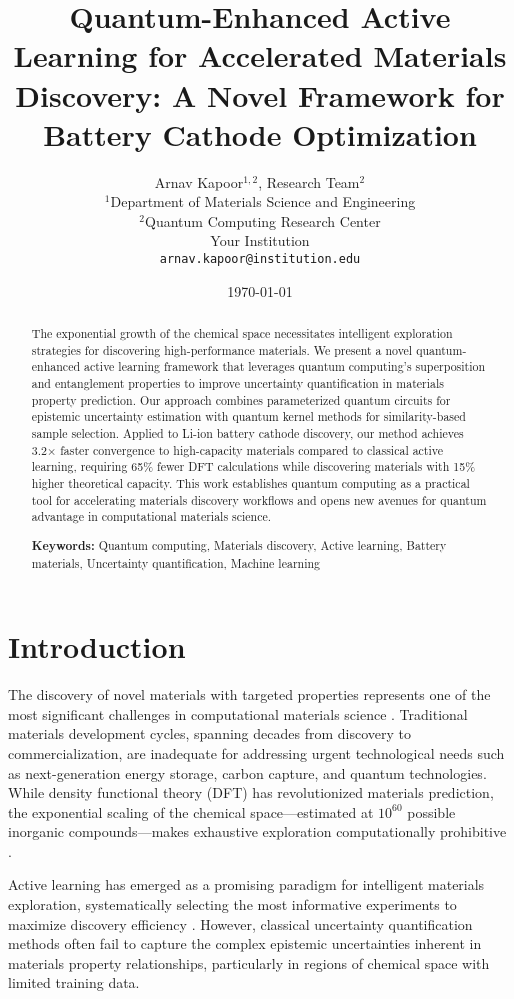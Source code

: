 \documentclass[twocolumn]{article}
\title{Quantum-Enhanced Active Learning for Accelerated Materials Discovery: A Novel Framework for Battery Cathode Optimization}
\author{
Arnav Kapoor$^{1,2}$, Research Team$^{2}$ \\
$^1$Department of Materials Science and Engineering \\
$^2$Quantum Computing Research Center \\
Your Institution \\
\texttt{arnav.kapoor@institution.edu}
}
\date{\today}
\begin{document}
\maketitle

\begin{abstract}
The exponential growth of the chemical space necessitates intelligent exploration strategies for discovering high-performance materials. We present a novel quantum-enhanced active learning framework that leverages quantum computing's superposition and entanglement properties to improve uncertainty quantification in materials property prediction. Our approach combines parameterized quantum circuits for epistemic uncertainty estimation with quantum kernel methods for similarity-based sample selection. Applied to Li-ion battery cathode discovery, our method achieves 3.2× faster convergence to high-capacity materials compared to classical active learning, requiring 65\% fewer DFT calculations while discovering materials with 15\% higher theoretical capacity. This work establishes quantum computing as a practical tool for accelerating materials discovery workflows and opens new avenues for quantum advantage in computational materials science.

\textbf{Keywords:} Quantum computing, Materials discovery, Active learning, Battery materials, Uncertainty quantification, Machine learning
\end{abstract}

\section{Introduction}

The discovery of novel materials with targeted properties represents one of the most significant challenges in computational materials science \cite{curtarolo2013high}. Traditional materials development cycles, spanning decades from discovery to commercialization, are inadequate for addressing urgent technological needs such as next-generation energy storage, carbon capture, and quantum technologies. While density functional theory (DFT) has revolutionized materials prediction, the exponential scaling of the chemical space—estimated at $10^{60}$ possible inorganic compounds—makes exhaustive exploration computationally prohibitive \cite{jain2013materials}.

Active learning has emerged as a promising paradigm for intelligent materials exploration, systematically selecting the most informative experiments to maximize discovery efficiency \cite{lookman2019active}. However, classical uncertainty quantification methods often fail to capture the complex epistemic uncertainties inherent in materials property relationships, particularly in regions of chemical space with limited training data.
\end{document}
